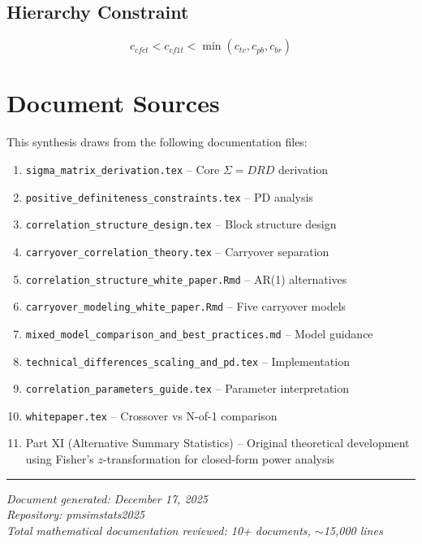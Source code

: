 \documentclass[11pt]{article}
\theoremstyle{definition}
\begin{document}
\subsection{Hierarchy Constraint}
\begin{equation}
c_{cfct} < c_{cf1t} < \min(c_{tv}, c_{pb}, c_{br})
\end{equation}

\section{Document Sources}

This synthesis draws from the following documentation files:
\begin{enumerate}
    \item \texttt{sigma\_matrix\_derivation.tex} -- Core $\Sigma = DRD$ derivation
    \item \texttt{positive\_definiteness\_constraints.tex} -- PD analysis
    \item \texttt{correlation\_structure\_design.tex} -- Block structure design
    \item \texttt{carryover\_correlation\_theory.tex} -- Carryover separation
    \item \texttt{correlation\_structure\_white\_paper.Rmd} -- AR(1) alternatives
    \item \texttt{carryover\_modeling\_white\_paper.Rmd} -- Five carryover models
    \item \texttt{mixed\_model\_comparison\_and\_best\_practices.md} -- Model guidance
    \item \texttt{technical\_differences\_scaling\_and\_pd.tex} -- Implementation
    \item \texttt{correlation\_parameters\_guide.tex} -- Parameter interpretation
    \item \texttt{whitepaper.tex} -- Crossover vs N-of-1 comparison
    \item Part XI (Alternative Summary Statistics) -- Original theoretical development
    using Fisher's $z$-transformation for closed-form power analysis
\end{enumerate}

\vspace{1cm}
\noindent\rule{\textwidth}{0.4pt}

\noindent\textit{Document generated: December 17, 2025}\\
\textit{Repository: pmsimstats2025}\\
\textit{Total mathematical documentation reviewed: 10+ documents, $\sim$15,000 lines}
\end{document}
